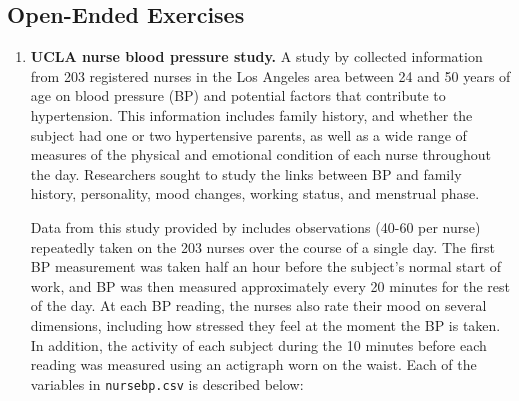 \documentclass[
]{krantz}
\begin{document}
\subsection{Open-Ended Exercises}\label{open-ended-exercises-5}

\begin{enumerate}
\def\labelenumi{\arabic{enumi}.}
\item
  \textbf{UCLA nurse blood pressure study.} A study by \citet{Goldstein2000} collected information from 203 registered nurses in the Los Angeles area between 24 and 50 years of age on blood pressure (BP) and potential factors that contribute to hypertension. This information includes family history, and whether the subject had one or two hypertensive parents, as well as a wide range of measures of the physical and emotional condition of each nurse throughout the day. Researchers sought to study the links between BP and family history, personality, mood changes, working status, and menstrual phase.

  Data from this study provided by \citet{Weiss2005} includes observations (40-60 per nurse) repeatedly taken on the 203 nurses over the course of a single day. The first BP measurement was taken half an hour before the subject's normal start of work, and BP was then measured approximately every 20 minutes for the rest of the day. At each BP reading, the nurses also rate their mood on several dimensions, including how stressed they feel at the moment the BP is taken. In addition, the activity of each subject during the 10 minutes before each reading was measured using an actigraph worn on the waist. Each of the variables in \texttt{nursebp.csv} is described below:


\end{enumerate}
\end{document}
